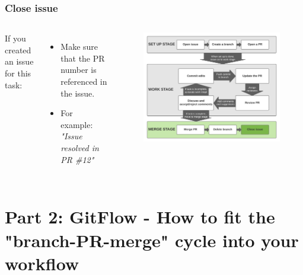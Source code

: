 \documentclass[aspectratio=169]{beamer} %
\begin{document}
\begin{frame}
	\frametitle{Close issue}
	\begin{columns}[c]
		
		If you created an issue for this task:
		\begin{itemize}
			\setlength\itemsep{.5em}
			\item Make sure that the PR number is referenced in the issue. 
			\item For example: \textit{"Issue resolved in PR \#12"}
		\end{itemize}
		
		\vspace{-.75cm}
		\begin{figure}
			\centering
			\includegraphics[width=\textwidth]{./img/branch-pr-merge-cycle-S3-3.png}
		\end{figure}
		
	\end{columns}
\end{frame}



\section{Part 2: \newline GitFlow - How to fit the "branch-PR-merge" cycle into your workflow}





\end{document}
